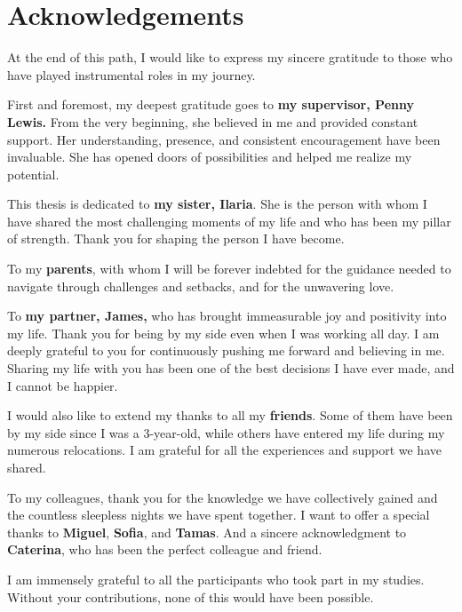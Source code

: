 \markboth{}{}
\chapter*{Acknowledgements}
\label{chapter:acknowledgments}

At the end of this path, I would like to express my sincere gratitude to those who have played instrumental roles in my journey.

First and foremost, my deepest gratitude goes to \textbf{my supervisor, Penny Lewis.} From the very beginning, she believed in me and provided constant support. Her understanding, presence, and consistent encouragement have been invaluable. She has opened doors of possibilities and helped me realize my potential.

This thesis is dedicated to \textbf{my sister, Ilaria}. She is the person with whom I have shared the most challenging moments of my life and who has been my pillar of strength. Thank you for shaping the person I have become.

To my \textbf{parents}, with whom I will be forever indebted for the guidance needed to navigate through challenges and setbacks, and for the unwavering love.

To \textbf{my partner, James,} who has brought immeasurable joy and positivity into my life. Thank you for being by my side even when I was working all day. I am deeply grateful to you for continuously pushing me forward and believing in me. Sharing my life with you has been one of the best decisions I have ever made, and I cannot be happier.

I would also like to extend my thanks to all my \textbf{friends}. Some of them have been by my side since I was a 3-year-old, while others have entered my life during my numerous relocations. I am grateful for all the experiences and support we have shared. 

To my colleagues, thank you for the knowledge we have collectively gained and the countless sleepless nights we have spent together. I want to offer a special thanks to \textbf{Miguel}, \textbf{Sofia}, and \textbf{Tamas}. And a sincere acknowledgment to \textbf{Caterina}, who has been the perfect colleague and friend.

I am immensely grateful to all the participants who took part in my studies. Without your contributions, none of this would have been possible. 
